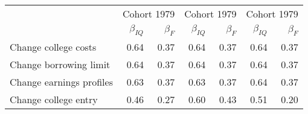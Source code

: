 \begin{tabular}{lrrrrrr}
\hline
   & \multicolumn{2}{|c|}{Cohort 1979} & \multicolumn{2}{|c|}{Cohort 1979} & \multicolumn{2}{|c|}{Cohort 1979} \\ 
 & $\beta_{IQ}$  & $\beta_{F}$  & $\beta_{IQ}$  & $\beta_{F}$  & $\beta_{IQ}$  & $\beta_{F}$  \\ 
\hline
Change college costs & 0.64  & 0.37  & 0.64  & 0.37  & 0.64  & 0.37  \\ 
Change borrowing limit & 0.64  & 0.37  & 0.64  & 0.37  & 0.64  & 0.37  \\ 
Change earnings profiles & 0.63  & 0.37  & 0.63  & 0.37  & 0.64  & 0.37  \\ 
Change college entry & 0.46  & 0.27  & 0.60  & 0.43  & 0.51  & 0.20  \\ 
\hline
\end{tabular}%
